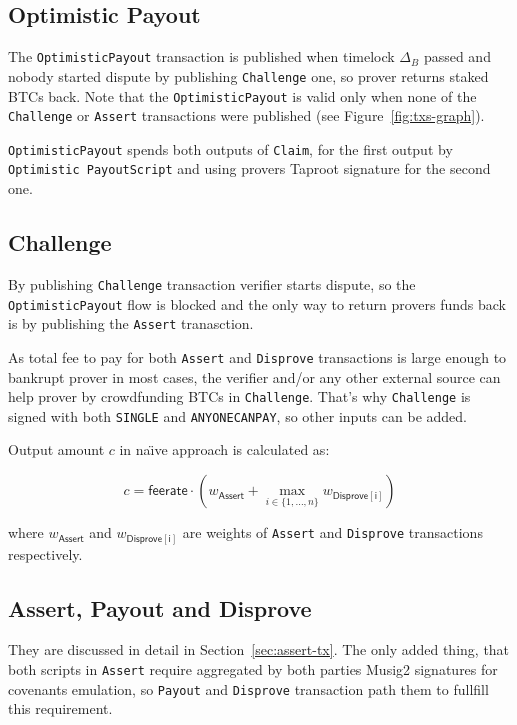 \documentclass{iacrtrans}
\begin{document}
\subsection{Optimistic Payout}\label{sec:optimistic-payout-tx}

The \texttt{OptimisticPayout} transaction is published when timelock
$\Delta_B$ passed and nobody started dispute by publishing
\texttt{Challenge} one, so prover returns staked BTCs back. Note that
the \texttt{OptimisticPayout} is valid only when none of the
\texttt{Challenge} or \texttt{Assert} transactions were published (see
Figure~\ref{fig:txs-graph}).

\texttt{OptimisticPayout} spends both outputs of \texttt{Claim}, for
the first output by \texttt{Optimistic PayoutScript} and using provers
Taproot signature for the second one.

\subsection{Challenge}\label{sec:challenge-tx}

By publishing \texttt{Challenge} transaction verifier starts dispute,
so the \texttt{OptimisticPayout} flow is blocked and the only way to
return provers funds back is by publishing the \texttt{Assert}
tranasction.

As total fee to pay for both \texttt{Assert} and \texttt{Disprove}
transactions is large enough to bankrupt prover in most cases, the
verifier and/or any other external source can help prover by
crowdfunding BTCs in \texttt{Challenge}. That's why \texttt{Challenge}
is signed with both \texttt{SINGLE} and \texttt{ANYONECANPAY}, so
other inputs can be added.

Output amount $c$ in na\"\i{}ve approach is calculated as:

\[
  c = \mathsf{feerate} \cdot (w_{\mathsf{Assert}} + \max_{i \in \{1, \ldots, n\}}{w_{\mathsf{Disprove[i]}}})
\]

where $w_{\mathsf{Assert}}$ and $w_{\mathsf{Disprove[i]}}$ are weights
of \texttt{Assert} and \texttt{Disprove} transactions respectively.

\subsection{Assert, Payout and
  Disprove}\label{sec:assert-payout-disprove-txs}

They are discussed in detail in Section~\ref{sec:assert-tx}. The only
added thing, that both scripts in \texttt{Assert} require aggregated
by both parties Musig2 signatures for covenants emulation, so
\texttt{Payout} and \texttt{Disprove} transaction path them to
fullfill this requirement.
\end{document}
